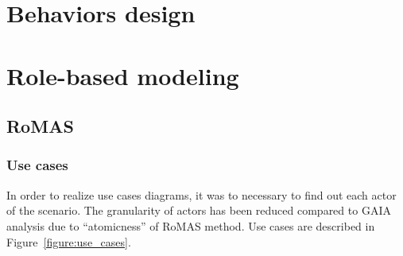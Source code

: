 \documentclass[a4paper,11pt]{report}
\begin{document}
  
  
  \section{Behaviors design} %
  

  
  
  \section{Role-based modeling} %
  
  \subsection{RoMAS}
  
  \subsubsection{Use cases}
   
  
  
  In order to realize use cases diagrams, it was to necessary to find out each actor 
  of the scenario. The granularity of actors has been reduced compared to GAIA analysis 
  due to ``atomicness'' of RoMAS method. Use cases are described in Figure~\ref{figure:use_cases}.
  
\end{document}
